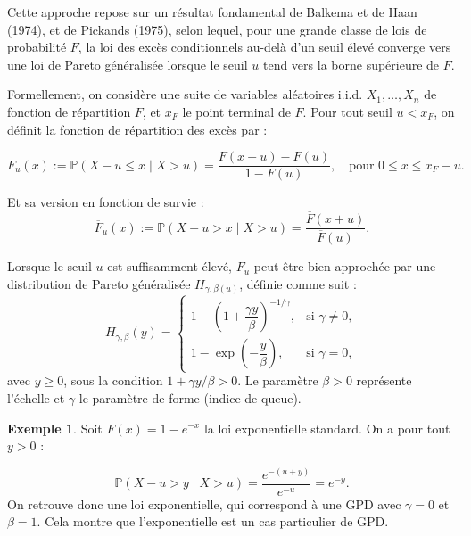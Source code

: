 \documentclass{article}
\theoremstyle{plain}
\theoremstyle{definition}
\newtheorem{example}[definition]{Exemple}
\theoremstyle{plain}
\begin{document}
\medskip
\noindent Cette approche repose sur un résultat fondamental de Balkema et de Haan (1974), et de Pickands (1975), selon lequel, pour une grande classe de lois de probabilité \(F\), la loi des excès conditionnels au-delà d’un seuil élevé converge vers une loi de Pareto généralisée lorsque le seuil \(u\) tend vers la borne supérieure de \(F\).

\medskip
\noindent Formellement, on considère une suite de variables aléatoires i.i.d. \(X_1, \dots, X_n\) de fonction de répartition \(F\), et \(x_F\) le point terminal de \(F\). Pour tout seuil \(u < x_F\), on définit la fonction de répartition des excès par :

\[
F_u(x) := \mathbb{P}(X - u \leq x \mid X > u) = \frac{F(x + u) - F(u)}{1 - F(u)},
\quad \text{pour } 0 \leq x \leq x_F - u.
\]

\noindent Et sa version en fonction de survie :
\[
\overline{F}_u(x) := \mathbb{P}(X - u > x \mid X > u) = \frac{\overline{F}(x + u)}{\overline{F}(u)}.
\]

\noindent Lorsque le seuil \(u\) est suffisamment élevé, \(F_u\) peut être bien approchée par une distribution de Pareto généralisée \(H_{\gamma, \beta(u)}\), définie comme suit :
\[
H_{\gamma, \beta}(y) =
\begin{cases}
1 - \left(1 + \dfrac{\gamma y}{\beta}\right)^{-1/\gamma}, & \text{si } \gamma \neq 0, \\
1 - \exp\left(-\dfrac{y}{\beta}\right), & \text{si } \gamma = 0,
\end{cases}
\]
avec \( y \geq 0 \), sous la condition \(1 + \gamma y/\beta > 0\). Le paramètre \(\beta > 0\) représente l’échelle et \(\gamma\) le paramètre de forme (indice de queue).

\medskip
\begin{example}
Soit \(F(x) = 1 - e^{-x}\) la loi exponentielle standard. On a pour tout \(y > 0\) :

\[
\mathbb{P}(X - u > y \mid X > u) = \frac{e^{-(u + y)}}{e^{-u}} = e^{-y}.
\]
On retrouve donc une loi exponentielle, qui correspond à une GPD avec \(\gamma = 0\) et \(\beta = 1\). Cela montre que l’exponentielle est un cas particulier de GPD.
\end{example}
\end{document}
